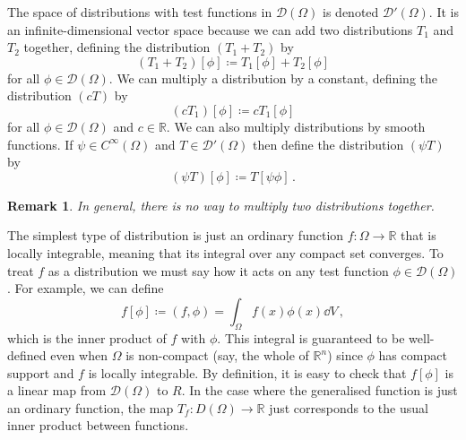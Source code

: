\documentclass{article}
\theoremstyle{plain}\theoremheaderfont{\normalfont\itshape}\theorembodyfont{\rmfamily}\theoremseparator{.}\newtheorem*{rem}{Remark}\newtheorem*{ex}{Example}\newtheorem*{proof}{Proof}\newtheorem*{altp}{Alternative proof}
\theoremstyle{plain}\theoremheaderfont{\normalfont\bfseries}\theorembodyfont{\rmfamily}\theoremseparator{.}\newtheorem{thm}{Theorem}[section]\newtheorem{lem}[thm]{Lemma}\newtheorem{prop}[thm]{Proposition}\newtheorem*{cor}{Corollary}\newtheorem{defn}[thm]{Definition}\newtheorem{clm}[thm]{Claim}\newtheorem{clminproof}{Claim}
\theoremstyle{break}\theoremheaderfont{\normalfont\itshape}\theorembodyfont{\rmfamily}\theoremseparator{.\medskip}\newtheorem*{proofskip}{Proof}\newtheorem*{exs}{Examples}\newtheorem*{rems}{Remarks}
\theoremstyle{break}\theoremheaderfont{\normalfont\bfseries}\theorembodyfont{\rmfamily}\theoremseparator{.\medskip}\newtheorem{lemskip}[thm]{Lemma}\newtheorem{defnskip}[thm]{Definition}\newtheorem{propskip}[thm]{Proposition}\newtheorem{thmskip}[thm]{Theorem}
\numberwithin{equation}{section}
\begin{document}
	The space of distributions with test functions in \(\mathcal{D}(\Omega)\) is denoted \(\mathcal{D}'(\Omega)\). It is an infinite-dimensional vector space because we can add two distributions \(T_1\) and \(T_2\) together, defining the distribution \((T_1+T_2)\) by
	\[(T_1+T_2)[\phi]\coloneqq T_1[\phi]+T_2[\phi]\]
	for all \(\phi\in\mathcal{D}(\Omega)\). We can multiply a distribution by a constant, defining the distribution \((cT)\) by
	\[(cT_1)[\phi]\coloneqq cT_1[\phi]\]
	for all \(\phi\in\mathcal{D}(\Omega)\) and \(c\in\mathbb{R}\). We can also multiply distributions by smooth functions. If \(\psi\in C^\infty(\Omega)\) and \(T\in\mathcal{D}'(\Omega)\) then define the distribution \((\psi T)\) by
	\[(\psi T)[\phi]\coloneqq T[\psi\phi]\,.\]
	\begin{rem}
		In general, there is no way to multiply two distributions together.
	\end{rem}
	The simplest type of distribution is just an ordinary function \(f:\Omega\to\mathbb{R}\) that is locally integrable, meaning that its integral over any compact set converges. To treat \(f\) as a distribution we must say how it acts on any test function \(\phi\in\mathcal{D}(\Omega)\). For example, we can define
	\[f[\phi]\coloneqq(f,\phi)=\int_\Omega f(x)\phi(x)\dd{V}\,,\]
	which is the inner product of \(f\) with \(\phi\). This integral is guaranteed to be well-defined even when \(\Omega\) is non-compact (say, the whole of \(\mathbb{R}^n\)) since \(\phi\) has compact support and \(f\) is locally integrable. By definition, it is easy to check that \(f[\phi]\) is a linear map from \(\mathcal{D}(\Omega)\) to \(R\). In the case where the generalised function is just an ordinary function, the map \(T_f:D(\Omega)\to\mathbb{R}\) just corresponds to the usual inner product between functions.
\end{document}
